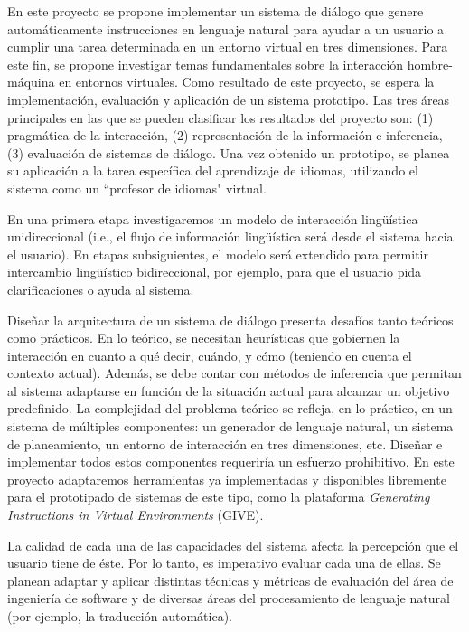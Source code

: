 
En este proyecto se propone implementar un sistema de di\'alogo que genere
autom\'aticamente
instrucciones en lenguaje natural para ayudar a un usuario a cumplir una tarea
determinada en un entorno virtual 
en tres dimensiones. Para este fin, se propone investigar temas fundamentales
sobre la
interacci\'on hombre-m\'aquina 
en entornos virtuales. Como resultado de este proyecto, se espera la
implementaci\'on, evaluaci\'on y aplicaci\'on de un sistema prototipo. Las tres
\'areas principales en las que se pueden clasificar los resultados del proyecto
son: (1) pragm\'atica de la interacci\'on, (2) representaci\'on
de la informaci\'on e inferencia, (3) evaluaci\'on de sistemas
de di\'alogo. Una vez obtenido
un prototipo, se planea su aplicaci\'on a la tarea espec\'ifica del 
aprendizaje de idiomas, utilizando el sistema como un ``profesor de idiomas"
virtual.

En una primera etapa investigaremos un modelo de interacci\'on 
ling\"u\'istica unidireccional
(i.e., el flujo de informaci\'on ling\"u\'istica ser\'a desde el sistema hacia
el usuario).
En etapas subsiguientes, el modelo ser\'a extendido para
permitir intercambio ling\"u\'istico bidireccional, por ejemplo, para que el
usuario pida clarificaciones o ayuda al sistema.

Dise\~nar la arquitectura de un sistema de di\'alogo presenta
desaf\'ios tanto te\'oricos como pr\'acticos. En lo te\'orico, se necesitan
heur\'isticas que gobiernen la interacci\'on en cuanto a qu\'e decir,
cu\'ando, y c\'omo (teniendo en cuenta el contexto actual). Adem\'as, se debe
contar con m\'etodos
de inferencia que permitan al sistema adaptarse en funci\'on de la situaci\'on
actual para alcanzar un objetivo predefinido.
La complejidad del problema te\'orico se
refleja, en lo pr\'actico, en un sistema de m\'ultiples componentes: un
generador de lenguaje natural, un sistema de planeamiento, un entorno de 
interacci\'on en tres dimensiones, etc.
Dise\~nar e implementar todos estos componentes requerir\'ia un esfuerzo
prohibitivo. En este proyecto adaptaremos herramientas ya
implementadas y disponibles libremente para el prototipado de sistemas de este
tipo, como la plataforma \textit{Generating Instructions in Virtual
Environments} (GIVE).

La calidad de cada una de las capacidades del sistema afecta la
percepci\'on que el usuario tiene de \'este. Por lo tanto, es imperativo
evaluar cada una de ellas.
Se planean adaptar y aplicar distintas t\'ecnicas y m\'etricas de evaluaci\'on
del \'area de ingenier\'ia de software y de diversas \'areas del procesamiento
de lenguaje natural (por ejemplo, la traducci\'on autom\'atica).
